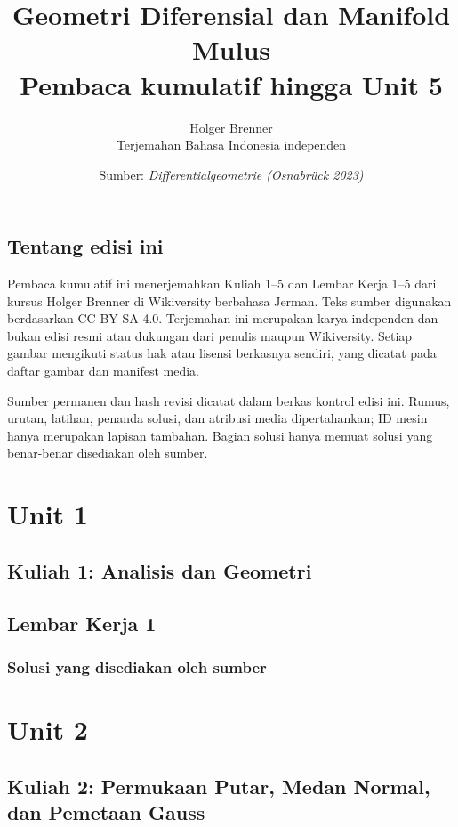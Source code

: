 \documentclass[11pt,a4paper,oneside]{book}
\title{Geometri Diferensial dan Manifold Mulus\\\large Pembaca kumulatif hingga Unit 5}
\author{Holger Brenner\\Terjemahan Bahasa Indonesia independen}
\date{Sumber: \textit{Differentialgeometrie (Osnabrück 2023)}}
\begin{document}
\hypersetup{pageanchor=false}
\maketitle
\hypersetup{pageanchor=true}
\frontmatter
\chapter*{Tentang edisi ini}
Pembaca kumulatif ini menerjemahkan Kuliah 1--5 dan Lembar Kerja 1--5 dari kursus Holger Brenner di Wikiversity berbahasa Jerman. Teks sumber digunakan berdasarkan CC BY-SA 4.0. Terjemahan ini merupakan karya independen dan bukan edisi resmi atau dukungan dari penulis maupun Wikiversity. Setiap gambar mengikuti status hak atau lisensi berkasnya sendiri, yang dicatat pada daftar gambar dan manifest media.

Sumber permanen dan hash revisi dicatat dalam berkas kontrol edisi ini. Rumus, urutan, latihan, penanda solusi, dan atribusi media dipertahankan; ID mesin hanya merupakan lapisan tambahan. Bagian solusi hanya memuat solusi yang benar-benar disediakan oleh sumber.
\tableofcontents

\mainmatter
\part{Unit 1}
\chapter[Kuliah 1]{Kuliah 1: Analisis dan Geometri}


\chapter{Lembar Kerja 1}


\section*{Solusi yang disediakan oleh sumber}


\part{Unit 2}
\chapter[Kuliah 2]{Kuliah 2: Permukaan Putar, Medan Normal, dan Pemetaan Gauss}

\end{document}
